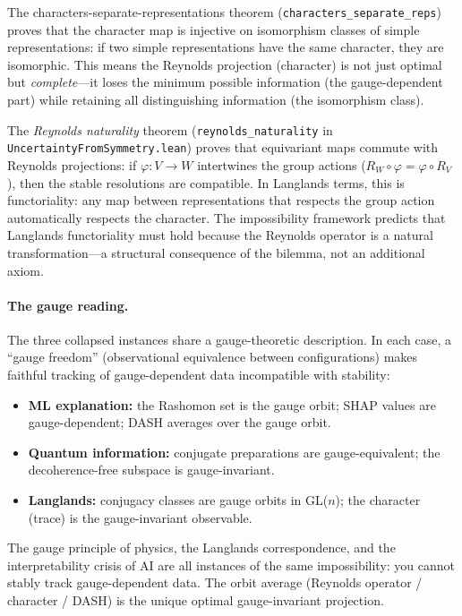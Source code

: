 \documentclass[11pt,a4paper]{article}
\begin{document}
The characters-separate-representations theorem (\texttt{characters\_separate\_reps}) proves that the character map is injective on isomorphism classes of simple representations: if two simple representations have the same character, they are isomorphic.  This means the Reynolds projection (character) is not just optimal but \emph{complete}---it loses the minimum possible information (the gauge-dependent part) while retaining all distinguishing information (the isomorphism class).

The \emph{Reynolds naturality} theorem (\texttt{reynolds\_naturality} in \texttt{UncertaintyFromSymmetry.lean}) proves that equivariant maps commute with Reynolds projections: if $\varphi : V \to W$ intertwines the group actions ($R_W \circ \varphi = \varphi \circ R_V$), then the stable resolutions are compatible.  In Langlands terms, this is functoriality: any map between representations that respects the group action automatically respects the character.  The impossibility framework predicts that Langlands functoriality must hold because the Reynolds operator is a natural transformation---a structural consequence of the bilemma, not an additional axiom.

\paragraph{The gauge reading.}
The three collapsed instances share a gauge-theoretic description.  In each case, a ``gauge freedom'' (observational equivalence between configurations) makes faithful tracking of gauge-dependent data incompatible with stability:
\begin{itemize}
  \item \textbf{ML explanation:} the Rashomon set is the gauge orbit; SHAP values are gauge-dependent; DASH averages over the gauge orbit.
  \item \textbf{Quantum information:} conjugate preparations are gauge-equivalent; the decoherence-free subspace is gauge-invariant.
  \item \textbf{Langlands:} conjugacy classes are gauge orbits in GL($n$); the character (trace) is the gauge-invariant observable.
\end{itemize}
The gauge principle of physics, the Langlands correspondence, and the interpretability crisis of AI are all instances of the same impossibility: you cannot stably track gauge-dependent data.  The orbit average (Reynolds operator / character / DASH) is the unique optimal gauge-invariant projection.
\end{document}

